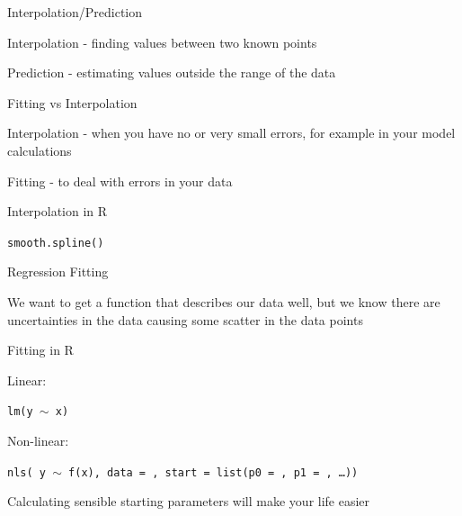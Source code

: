 \documentclass{beamer}
\begin{document}
\begin{frame}{Interpolation/Prediction}

Interpolation - finding values between two known points

\vspace{5mm}

Prediction - estimating values outside the range of the data

\end{frame}



\begin{frame}{Fitting vs Interpolation}

Interpolation - when you have no or very small errors, for example in your model calculations

\vspace{5mm}

Fitting - to deal with errors in your data

\end{frame}



\begin{frame}{Interpolation in R}

\texttt{smooth.spline()}

\end{frame}

\begin{frame}{Regression Fitting}

We want to get a function that describes our data well, but we know there are uncertainties in the data causing some scatter in the data points

\end{frame}

\begin{frame}{Fitting in R}


Linear:

\texttt{lm(y $\sim$ x)}

\vspace{5mm}

Non-linear:

\texttt{nls( y $\sim$ f(x), data = , start = list(p0 = , p1 = , \ldots))}


\vspace{5mm}

Calculating sensible starting parameters will make your life easier

\end{frame}
\end{document}
